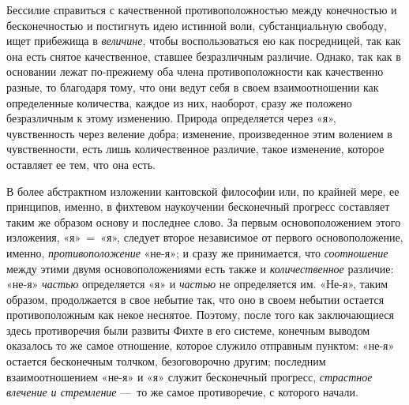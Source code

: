 Бессилие справиться с качественной противоположностью между конечностью и
бесконечностью и постигнуть идею истинной воли, субстанциальную свободу,
ищет прибежища в {\em величине}, чтобы воспользоваться
ею как посредницей, так как она есть снятое качественное, ставшее
безразличным различие. Однако, так как в основании лежат по-прежнему оба
члена противоположности как качественно разные, то благодаря тому, что они
ведут себя в своем взаимоотношении как определенные количества, каждое из
них, наоборот, сразу же положено безразличным к этому изменению. Природа
определяется через «я», чувственность через веление добра; изменение,
произведенное этим волением в чувственности, есть лишь количественное
различие, такое изменение, которое оставляет ее тем, что она есть.

В более абстрактном изложении кантовской философии или, по крайней мере, ее
принципов, именно, в фихтевом наукоучении бесконечный прогресс составляет
таким же образом основу и последнее слово. За первым основоположением этого
изложения, «я»~=~«я», следует второе независимое от первого
основоположение, именно, {\em противоположение} «не-я»;
и сразу же принимается, что {\em соотношение} между
этими двумя основоположениями есть также и
{\em количественное} различие: «не-я»
{\em частью} определяется «я» и
{\em частью} не определяется им. «Не-я», таким образом,
продолжается в свое небытие так, что оно в своем небытии остается
противоположным как некое неснятое. Поэтому, после того как заключающиеся
здесь противоречия были развиты Фихте в его системе, конечным выводом
оказалось то же самое отношение, которое служило отправным пунктом: «не-я»
остается бесконечным
толчком, безоговорочно другим; последним
взаимоотношением «не-я» и «я» служит бесконечный прогресс,
{\em страстное влечение и стремление} —~то же самое
противоречие, с которого начали.

